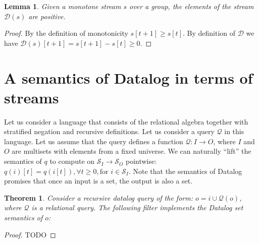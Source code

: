 \documentclass[10pt]{article}
\newtheorem{theorem}{Theorem}[section]
\newtheorem{lemma}{Lemma}[section]
\newcommand{\stream}[1]{\ensuremath{\mathcal{S}_{#1}}}
\newcommand{\zm}{\ensuremath{z^{-1}}} %
\newcommand{\D}{\mathcal{D}}  %
\newcommand{\distinct}{\mathit{distinct}}  %
\newcommand{\q}{\ensuremath{\mathcal{Q}}}  %
\begin{document}
\begin{lemma}
Given a monotone stream $s$ over a group, the elements of the stream
$\D(s)$ are positive.
\end{lemma}
\begin{proof}
  By the definition of monotonicity $s[t+1] \geq s[t]$.  By definition
  of $\D$ we have $\D(s)[t+1] = s[t+1] - s[t] \geq 0$.
\end{proof}

\section{A semantics of Datalog in terms of streams}

Let us consider a language that consists of the relational algebra
together with stratified negation and recursive definitions.  Let us
consider a query $\q$ in this language.  Let us assume that the query
defines a function $\q : I \rightarrow O$, where $I$ and $O$ are
multisets with elements from a fixed universe.  We can naturally
``lift'' the semantics of $q$ to compute on $\stream{I} \rightarrow
\stream{O}$ pointwise: $q(i)[t] = q(i[t]), \forall t \geq 0, \mbox {
  for } i \in \stream{I}$.  Note that the semantics of Datalog
promises that once an input is a set, the output is also a set.

\begin{theorem}
Consider a recursive datalog query of the form: $o = i \cup \q(o)$,
where $\q$ is a relational query.  The following filter implements the
Datalog set semantics of $o$:

\end{theorem}
\begin{proof}
  TODO
\end{proof}
\end{document}
